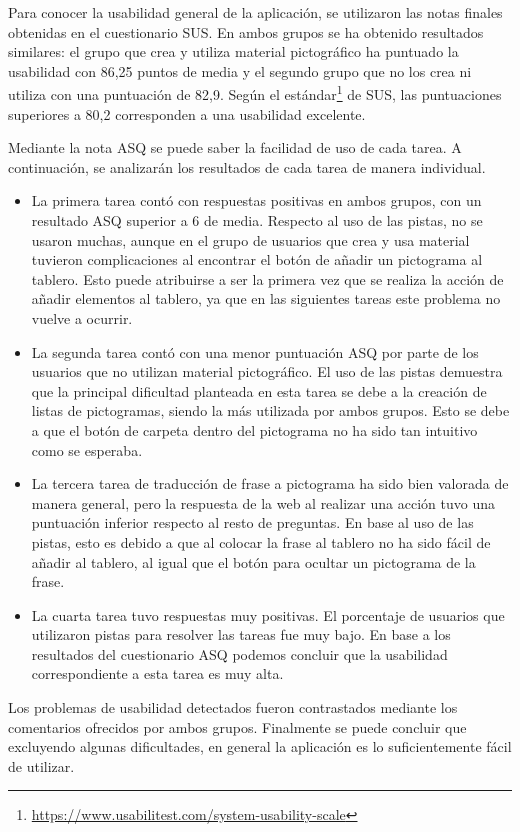 Para conocer la usabilidad general de la aplicación, se utilizaron las notas finales obtenidas en el cuestionario SUS. En ambos grupos se ha obtenido resultados similares: el grupo que crea y utiliza material pictográfico ha puntuado la usabilidad con 86,25 puntos de media y el segundo grupo que no los crea ni utiliza con una puntuación de 82,9. Según el estándar\footnote{\url{https://www.usabilitest.com/system-usability-scale}} de SUS, las puntuaciones superiores a 80,2 corresponden a una usabilidad excelente. 


Mediante la nota ASQ se puede saber la facilidad de uso de cada tarea. A continuación, se analizarán los resultados de cada tarea de manera individual.

\begin{itemize}
	\item La primera tarea contó con respuestas positivas en ambos grupos, con un resultado ASQ superior a 6 de media. Respecto al uso de las pistas, no se usaron muchas, aunque en el grupo de usuarios que crea y usa material tuvieron complicaciones al encontrar el botón de añadir un pictograma al tablero. Esto puede atribuirse a ser la primera vez que se realiza la acción de añadir elementos al tablero, ya que en las siguientes tareas este problema no vuelve a ocurrir. 
	
	\item La segunda tarea contó con una menor puntuación ASQ por parte de los usuarios que no utilizan material pictográfico. El uso de las pistas demuestra que la principal dificultad planteada en esta tarea se debe a la creación de listas de pictogramas, siendo la más utilizada por ambos grupos. Esto se debe a que el botón de carpeta dentro del pictograma no ha sido tan intuitivo como se esperaba.
	
	
	\item La tercera tarea de traducción de frase a pictograma ha sido bien valorada de manera general, pero la respuesta de la web al realizar una acción tuvo una puntuación inferior respecto al resto de preguntas. En base al uso de las pistas, esto es debido a que al colocar la frase al tablero no ha sido fácil de añadir al tablero, al igual que el botón para ocultar un pictograma de la frase.
	
	
	\item La cuarta tarea tuvo respuestas muy positivas. El porcentaje de usuarios que utilizaron pistas para resolver las tareas fue muy bajo. En base a los resultados del cuestionario ASQ podemos concluir que la usabilidad correspondiente a esta tarea es muy alta.
\end{itemize}

Los problemas de usabilidad detectados fueron contrastados mediante los comentarios ofrecidos por ambos grupos. Finalmente se puede concluir que excluyendo algunas dificultades, en general la aplicación es lo suficientemente fácil de utilizar.

